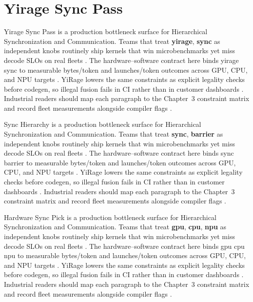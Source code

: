 \section{Yirage Sync Pass}
\label{sec:yirage_sync_pass}

Yirage Sync Pass is a production bottleneck surface for Hierarchical Synchronization and Communication. Teams that treat \textbf{yirage}, \textbf{sync} as independent knobs routinely ship kernels that win microbenchmarks yet miss decode SLOs on real fleets \citep{nvidia2022hopper,amd2024aie}. The hardware--software contract here binds yirage sync to measurable bytes/token and launches/token outcomes across GPU, CPU, and NPU targets \citep{semianalysis2024tma,dlbook}. YiRage lowers the same constraints as explicit legality checks before codegen, so illegal fusion fails in CI rather than in customer dashboards \citep{amd2024xdna,dao2022flashattention}. Industrial readers should map each paragraph to the Chapter~3 constraint matrix and record fleet measurements alongside compiler flags \citep{amd2024aie,kwon2023vllm}.

Sync Hierarchy is a production bottleneck surface for Hierarchical Synchronization and Communication. Teams that treat \textbf{sync}, \textbf{barrier} as independent knobs routinely ship kernels that win microbenchmarks yet miss decode SLOs on real fleets \citep{taxbreak2026,semianalysis2024tma}. The hardware--software contract here binds sync barrier to measurable bytes/token and launches/token outcomes across GPU, CPU, and NPU targets \citep{memoryfloor2026,amd2024xdna}. YiRage lowers the same constraints as explicit legality checks before codegen, so illegal fusion fails in CI rather than in customer dashboards \citep{nvidia2022hopper,amd2024aie}. Industrial readers should map each paragraph to the Chapter~3 constraint matrix and record fleet measurements alongside compiler flags \citep{semianalysis2024tma,dlbook}.

Hardware Sync Pick is a production bottleneck surface for Hierarchical Synchronization and Communication. Teams that treat \textbf{gpu}, \textbf{cpu}, \textbf{npu} as independent knobs routinely ship kernels that win microbenchmarks yet miss decode SLOs on real fleets \citep{memoryfloor2026,amd2024xdna}. The hardware--software contract here binds gpu cpu npu to measurable bytes/token and launches/token outcomes across GPU, CPU, and NPU targets \citep{nvidia2022hopper,amd2024aie}. YiRage lowers the same constraints as explicit legality checks before codegen, so illegal fusion fails in CI rather than in customer dashboards \citep{semianalysis2024tma,dlbook}. Industrial readers should map each paragraph to the Chapter~3 constraint matrix and record fleet measurements alongside compiler flags \citep{amd2024xdna,dao2022flashattention}.

